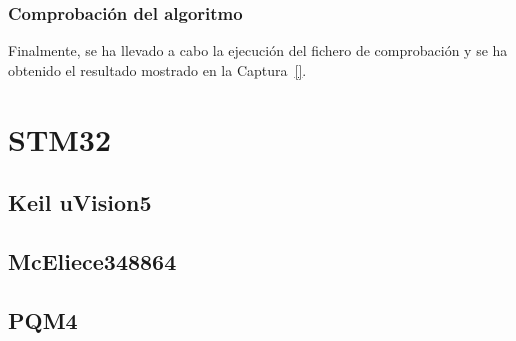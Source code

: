 \subsubsection{Comprobación del algoritmo}\label{subsubsec:sphincs-comp}

Finalmente, se ha llevado a cabo la ejecución del fichero de comprobación y se ha obtenido el resultado mostrado en la Captura~\ref{}.



\section{STM32}\label{sec:stm32}



\subsection{Keil uVision5}\label{subsec:keil}



\subsection{McEliece348864}\label{subsec:mceliece-stm}



\subsection{PQM4}\label{subsec:pqm4}




